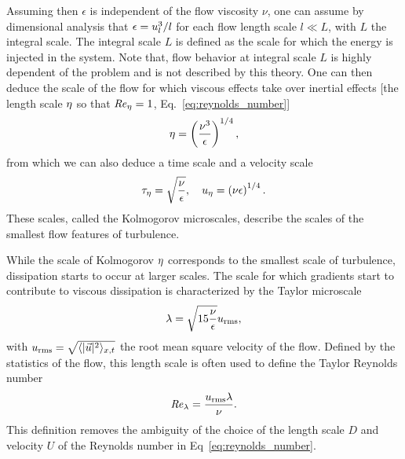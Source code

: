 Assuming then $\epsilon$ is independent of the flow viscosity $\nu$, one can assume by dimensional analysis that $\epsilon = u_l^3 / l$ for each flow length scale $l \ll L$, with $L$ the integral scale.
The integral scale $L$ is defined as the scale for which the energy is injected in the system.
Note that, flow behavior at integral scale $L$ is highly dependent of the problem and is not described by this theory.
One can then deduce the scale of the flow for which viscous effects take over inertial effects [the length scale $\eta$ so that $\mathit{Re}_{\eta} = 1$, Eq.~\eqref{eq:reynolds_number}]
\begin{equation}
	\label{eq:kolmogorov_scale}
	\eta = \left( \frac{\nu^3}{\epsilon} \right)^{1/4},
\end{equation}
from which we can also deduce a time scale and a velocity scale
\begin{equation}
	\label{eq:kolmogorov}
	\tau_{\eta} = \sqrt{\frac{\nu}{\epsilon}}, \quad u_{\eta} = \left(\nu \epsilon \right)^{1/4}.
\end{equation}
These scales, called the Kolmogorov microscales, describe the scales of the smallest flow features of turbulence.

While the scale of Kolmogorov $\eta$ corresponds to the smallest scale of turbulence, dissipation starts to occur at larger scales.
The scale for which gradients start to contribute to viscous dissipation is characterized by the Taylor microscale \citep{taylor1935statistical}
\begin{equation}
	\label{eq:taylor_microscale}
	\lambda = \sqrt{15 \frac{\nu}{\epsilon}} u_{\mathrm{rms}},
\end{equation}
with $u_{\mathrm{rms}} = \sqrt{ \langle \lvert\vec{u}\rvert^2 \rangle_{x,t} }$ the root mean square velocity of the flow.
Defined by the statistics of the flow, this length scale is often used to define the Taylor Reynolds number
\begin{equation}\label{eq:taylor_scale_reynolds}
	\mathit{Re}_{\lambda} = \frac{u_{\mathrm{rms}} \lambda}{\nu}.
\end{equation}
This definition removes the ambiguity of the choice of the length scale $D$ and velocity $U$ of the Reynolds number in Eq~\eqref{eq:reynolds_number}.

